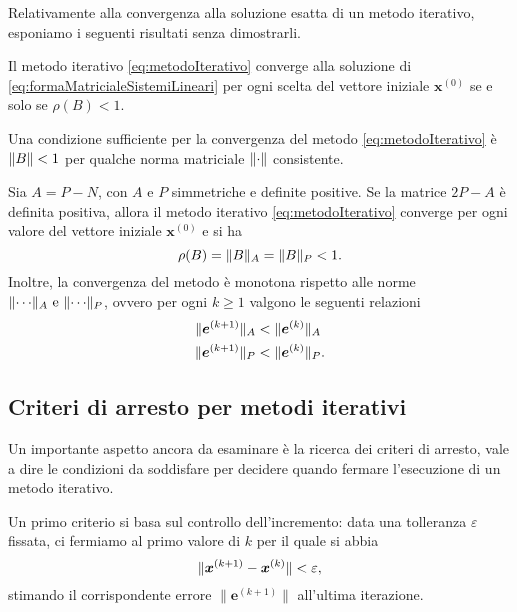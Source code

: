 Relativamente alla convergenza alla soluzione esatta di un metodo iterativo, esponiamo i seguenti risultati senza dimostrarli.
\begin{teorema}
    Il metodo iterativo \eqref{eq:metodoIterativo} converge alla soluzione di \eqref{eq:formaMatricialeSistemiLineari} per ogni scelta del vettore iniziale
    $\bm{x}^{(0)}$ se e solo se $\rho(B)<1$.
\end{teorema}
\begin{corollario}
    \label{cor:condizioneSufficienteConvergenza}
    Una condizione sufficiente per la convergenza del metodo \eqref{eq:metodoIterativo} \`e $\lVert B\rVert<1$ per qualche norma matriciale $\lVert\cdot\rVert$ consistente.
\end{corollario}
\begin{teorema}
    Sia $A = P - N$, con $A$ e $P$ simmetriche e definite positive. Se la matrice $2P - A$ \`e definita positiva, allora il metodo iterativo \eqref{eq:metodoIterativo} converge per ogni valore del vettore iniziale $\bm{x}^{(0)}$ e si ha \[\rho(B) = \lVert B\rVert_{A} = \lVert B\rVert_{P} < 1.\]
    Inoltre, la convergenza del metodo \`e monotona rispetto alle norme $\norm{\cdots}_{A} \ \text{e} \ \norm{\cdots}_{P}$, ovvero per ogni $k \ge 1$ valgono le seguenti relazioni
    \[
    \begin{aligned}
        \lVert\bm{e}^{(k+1)}\rVert_{A} &< \lVert\bm{e}^{(k)}\rVert_{A} \\
        \lVert\bm{e}^{(k+1)}\rVert_{P} &< \lVert\bm{e}^{(k)}\rVert_{P}.
    \end{aligned}
    \]
\end{teorema}
\subsection{Criteri di arresto per metodi iterativi}
\label{sec:criteriArresto}
Un importante aspetto ancora da esaminare \`e la ricerca dei criteri di arresto, vale a dire le condizioni da soddisfare per decidere quando fermare l'esecuzione di un
metodo iterativo.

Un primo criterio si basa sul controllo dell'incremento: data una tolleranza $\varepsilon$ fissata, ci fermiamo al primo valore di $k$ per il quale si abbia
\begin{equation*}
    \lVert\bm{x}^{(k+1)} - \bm{x}^{(k)}\rVert<\varepsilon,
\end{equation*}
stimando il corrispondente errore $\|\bm{e}^{(k+1)}\|$ all'ultima iterazione.

